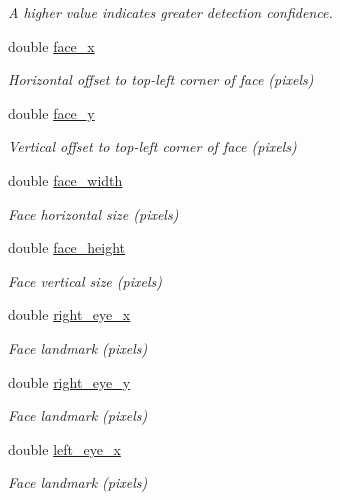 \begin{DoxyCompactItemize}
\begin{DoxyCompactList}\small\item\em A higher value indicates greater detection confidence. \end{DoxyCompactList}\item 
double \hyperlink{structjanus__attributes_ae601c39225ae377dfa1728ef5b8b245b}{face\+\_\+x}
\begin{DoxyCompactList}\small\item\em Horizontal offset to top-\/left corner of face (pixels) \end{DoxyCompactList}\item 
double \hyperlink{structjanus__attributes_afc92218bb77128e6e2c10337d3413545}{face\+\_\+y}
\begin{DoxyCompactList}\small\item\em Vertical offset to top-\/left corner of face (pixels) \end{DoxyCompactList}\item 
double \hyperlink{structjanus__attributes_ad79876a2b52d6a1a5d1290a7d401e46a}{face\+\_\+width}
\begin{DoxyCompactList}\small\item\em Face horizontal size (pixels) \end{DoxyCompactList}\item 
double \hyperlink{structjanus__attributes_ad372c599888c24f3105f3a6010d84cb0}{face\+\_\+height}
\begin{DoxyCompactList}\small\item\em Face vertical size (pixels) \end{DoxyCompactList}\item 
double \hyperlink{structjanus__attributes_a2f683b4d1d832b31b6cb6a21c7288e57}{right\+\_\+eye\+\_\+x}
\begin{DoxyCompactList}\small\item\em Face landmark (pixels) \end{DoxyCompactList}\item 
double \hyperlink{structjanus__attributes_aec075ed78bd9488a3be40968e303dbc1}{right\+\_\+eye\+\_\+y}
\begin{DoxyCompactList}\small\item\em Face landmark (pixels) \end{DoxyCompactList}\item 
double \hyperlink{structjanus__attributes_a043531c626035ccc2685f8d97c83de6a}{left\+\_\+eye\+\_\+x}
\begin{DoxyCompactList}\small\item\em Face landmark (pixels) \end{DoxyCompactList}\item 

\end{DoxyCompactItemize}
